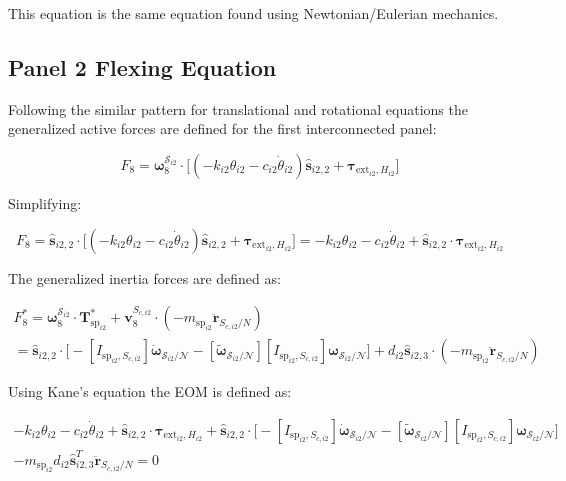 \documentclass[paper]{aiaaNew}
\begin{document}
This equation is the same equation found using Newtonian/Eulerian mechanics.

\subsection{Panel 2 Flexing Equation}
Following the similar pattern for translational and rotational equations the generalized active forces are defined for the first interconnected panel:

\begin{equation}
F_{8} = \bm \omega_{8}^{\mathcal{S}_{i2}} \cdot \Big[  (-k_{i2} \theta_{i2} - c_{i2} \dot{\theta}_{i2})\bm{\hat{s}}_{i2,2} + \bm \tau_{\text{ext}_{i2},H_{i2}} \Big]
\end{equation}

Simplifying:

\begin{equation}
F_{8} = \bm{\hat{s}}_{i2,2} \cdot \Big[  (-k_{i2} \theta_{i2} - c_{i2} \dot{\theta}_{i2})\bm{\hat{s}}_{i2,2} + \bm \tau_{\text{ext}_{i2},H_{i2}} \Big] = -k_{i2} \theta_{i2} - c_{i2} \dot{\theta}_{i2} + \bm{\hat{s}}_{i2,2} \cdot \bm \tau_{\text{ext}_{i2},H_{i2}}
\end{equation}

The generalized inertia forces are defined as: 

\begin{multline}
F^*_{8} = \bm \omega_{\textit{8}}^{\mathcal{S}_{i2}} \cdot \bm T^*_{\text{sp}_{i2}}  + \bm v^{S_{c,i2}}_{8} \cdot (-m_{\text{sp}_{i2}} \ddot{\bm{r}}_{S_{c,i2}/N}) \\
= \bm{\hat{s}}_{i2,2} \cdot \Big[-[I_{\text{sp}_{i2},S_{c,i2}}] \dot{\bm\omega}_{\mathcal{S}_{i2}/\mathcal{N}}  -[\tilde{\bm \omega}_{\mathcal{S}_{i2}/\mathcal{N}}] [I_{\text{sp}_{i2},S_{c,i2}}] \bm \omega_{\mathcal{S}_{i2}/\mathcal{N}} \Big] + d_{i2}\bm{\hat{s}}_{i2,3} \cdot (-m_{\text{sp}_{i2}} \ddot{\bm{r}}_{S_{c,i2}/N})
\end{multline}

Using Kane's equation the EOM is defined as:

\begin{multline}
-k_{i2} \theta_{i2} - c_{i2} \dot{\theta}_{i2} + \bm{\hat{s}}_{i2,2} \cdot \bm \tau_{\text{ext}_{i2},H_{i2}} + \bm{\hat{s}}_{i2,2} \cdot \Big[-[I_{\text{sp}_{i2},S_{c,i2}}] \dot{\bm\omega}_{\mathcal{S}_{i2}/\mathcal{N}}  -[\tilde{\bm \omega}_{\mathcal{S}_{i2}/\mathcal{N}}] [I_{\text{sp}_{i2},S_{c,i2}}] \bm \omega_{\mathcal{S}_{i2}/\mathcal{N}} \Big] \\
- m_{\text{sp}_{i2}} d_{i2}\bm{\hat{s}}_{i2,3}^T \ddot{\bm{r}}_{S_{c,i2}/N} = 0
\end{multline}
\end{document}
